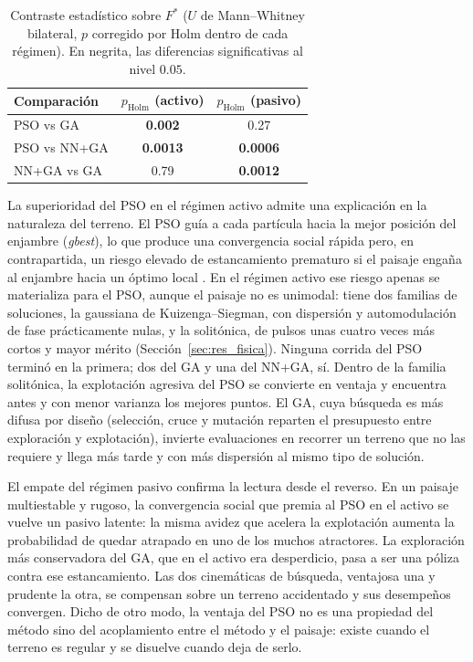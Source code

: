\begin{table}[htbp]
  \centering\small
  \caption[Contraste estadístico sobre el mérito]{Contraste estadístico sobre $F^\ast$ ($U$ de Mann--Whitney bilateral,
  $p$ corregido por Holm dentro de cada régimen). En negrita, las diferencias
  significativas al nivel $0.05$.}
  \label{tab:res_pvalores}
  \begin{tabular}{lcc}
    \toprule
    Comparación & $p_{\mathrm{Holm}}$ (activo) & $p_{\mathrm{Holm}}$ (pasivo) \\
    \midrule
    PSO vs GA     & \textbf{0.002}  & 0.27 \\
    PSO vs NN+GA  & \textbf{0.0013} & \textbf{0.0006} \\
    NN+GA vs GA   & 0.79            & \textbf{0.0012} \\
    \bottomrule
  \end{tabular}
\end{table}

La superioridad del PSO en el régimen activo admite una explicación en la naturaleza
del terreno. El PSO guía a cada partícula hacia la mejor posición del enjambre
(\emph{gbest}), lo que produce una convergencia social rápida pero, en contrapartida,
un riesgo elevado de estancamiento prematuro si el paisaje engaña al enjambre hacia un
óptimo local \cite{Kennedy1995}. %
En el régimen activo ese riesgo apenas se materializa para el PSO, aunque el paisaje no
es unimodal: tiene dos familias de soluciones, la gaussiana de Kuizenga--Siegman, con
dispersión y automodulación de fase prácticamente nulas, y la solitónica, de pulsos unas
cuatro veces más cortos y mayor mérito (Sección~\ref{sec:res_fisica}). Ninguna corrida
del PSO terminó en la primera; dos del GA y una del NN+GA, sí. Dentro de la familia
solitónica, la explotación agresiva del PSO se convierte en ventaja y encuentra antes y
con menor varianza los mejores puntos. El GA, cuya
búsqueda es más difusa por diseño (selección, cruce y mutación reparten el presupuesto
entre exploración y explotación), invierte evaluaciones en recorrer un terreno que no
las requiere y llega más tarde y con más dispersión al mismo tipo de solución.

El empate del régimen pasivo confirma la lectura desde el reverso. En un paisaje
multiestable y rugoso, la convergencia social que premia al PSO en el activo se vuelve
un pasivo latente: la misma avidez que acelera la explotación aumenta la probabilidad de
quedar atrapado en uno de los muchos atractores. La exploración más conservadora del GA,
que en el activo era desperdicio, pasa a ser una póliza contra ese estancamiento. Las
dos cinemáticas de búsqueda, ventajosa una y prudente la otra, se compensan sobre un
terreno accidentado y sus desempeños convergen. Dicho de otro modo, la ventaja del PSO
no es una propiedad del método sino del acoplamiento entre el método y el paisaje: existe
cuando el terreno es regular y se disuelve cuando deja de serlo.

